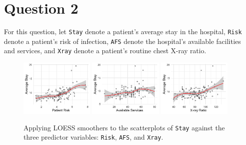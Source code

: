 \documentclass[10pt]{article}
\begin{document}
\section{Question 2} \noindent
For this question, let \texttt{Stay} denote a patient's average stay in the hospital, \texttt{Risk} denote a patient's risk of infection, \texttt{AFS} 
denote the hospital's available facilities and services, and \texttt{Xray} denote a patient's routine chest X-ray ratio. 
\begin{figure}[ht]
    \includegraphics[width = 0.32\textwidth]{q02_loess1.png}
    \includegraphics[width = 0.32\textwidth]{q02_loess2.png}
    \includegraphics[width = 0.32\textwidth]{q02_loess3.png}
    \caption{Applying LOESS smoothers to the scatterplots of \texttt{Stay} against the three predictor variables: \texttt{Risk}, \texttt{AFS}, and 
    \texttt{Xray}.}
    \label{q02_fig01}
\end{figure}
\end{document}
